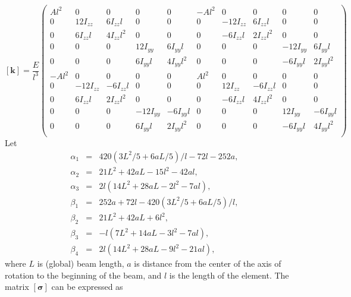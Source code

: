 \[
\mathbf{[k]} = 
\frac{E}{l^3}\begin{pmatrix}
  Al^2 &  0 &    0 &  0 &    0 & -Al^2 &   0 &    0 &   0 &    0\\
 0 &  12I_{zz} &   6I_{zz}l &  0 &    0 & 0 &  -12I_{zz} &   6I_{zz}l &   0 &    0\\
 0 & 6I_{zz}l & 4I_{zz}l^2 &  0 &    0 & 0 & -6I_{zz}l & 2I_{zz}l^2 &   0 &    0\\
 0 &  0 &    0 &  12I_{yy} &   6I_{yy}l & 0 &   0 &    0 &  -12I_{yy} &   6I_{yy}l\\
 0 &  0 &    0 & 6I_{yy}l & 4I_{yy}l^2 & 0 &   0 &    0 & -6I_{yy}l & 2I_{yy}l^2\\
 -Al^2 &  0 &    0 &  0 &    0 &  Al^2 &   0 &    0 &   0 &    0\\
 0 & -12I_{zz} &  -6I_{zz}l &  0 &    0 & 0 &   12I_{zz} &  -6I_{zz}l &   0 &    0\\
 0 & 6I_{zz}l & 2I_{zz}l^2 &  0 &    0 & 0 & -6I_{zz}l & 4I_{zz}l^2 &   0 &    0\\
 0 &  0 &    0 & -12I_{yy} &  -6I_{yy}l & 0 &   0 &    0 &   12I_{yy} &  -6I_{yy}l\\
 0 &  0 &    0 & 6I_{yy}l & 2I_{yy}l^2 & 0 &   0 &    0 & -6I_{yy}l & 4I_{yy}l^2\\
\end{pmatrix}
\]
Let 
\begin{eqnarray*}
\alpha_1 &=& 420(3L^2/5 + 6aL/5)/l - 72l - 252a, \\
\alpha_2 &=& 21L^2 + 42aL - 15l^2 - 42al, \\
\alpha_3 &=& 2l(14L^2 + 28aL - 2l^2 - 7al),\\
\beta_1 &=& 252a + 72l - 420(3L^2/5 + 6aL/5)/l,\\
\beta_2 &=& 21L^2 + 42aL + 6l^2,\\
\beta_3 &=& -l(7L^2 + 14aL - 3l^2 - 7al),\\
\beta_4 &=& 2l(14L^2 + 28aL - 9l^2 - 21al),
\end{eqnarray*}
where $L$ is (global) beam length, $a$ is distance from the center of the axis of rotation to the beginning of the beam, and $l$ is the length of the element.
The matrix $\mathbf{[\sigma]}$ can be expressed as
